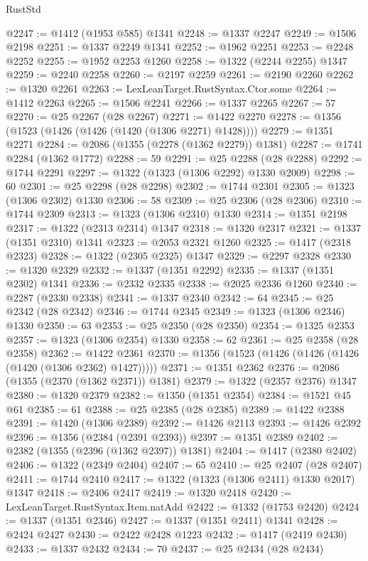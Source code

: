 \begin{lexlean}{RustStd}
\begin{coremodule}
@2247 := @1412 (@1953 @585) @1341
@2248 := @1337 @2247
@2249 := @1506 @2198
@2251 := @1337 @2249 @1341
@2252 := @1962 @2251
@2253 := @2248 @2252
@2255 := @1952 @2253 @1260
@2258 := @1322 (@2244 @2255) @1347
@2259 := @2240 @2258
@2260 := @2197 @2259
@2261 := @2190 @2260
@2262 := @1320 @2261
@2263 := LexLeanTarget.RustSyntax.Ctor.some
@2264 := @1412 @2263
@2265 := @1506 @2241
@2266 := @1337 @2265
@2267 := 57
@2270 := @25 @2267 (@28 @2267)
@2271 := @1422 @2270
@2278 := @1356 (@1523 (@1426 (@1426 (@1420 (@1306 @2271) @1428))))
@2279 := @1351 @2271
@2284 := @2086 (@1355 (@2278 (@1362 @2279)) @1381)
@2287 := @1741 @2284 (@1362 @1772)
@2288 := 59
@2291 := @25 @2288 (@28 @2288)
@2292 := @1744 @2291
@2297 := @1322 (@1323 (@1306 @2292) @1330 @2009)
@2298 := 60
@2301 := @25 @2298 (@28 @2298)
@2302 := @1744 @2301
@2305 := @1323 (@1306 @2302) @1330
@2306 := 58
@2309 := @25 @2306 (@28 @2306)
@2310 := @1744 @2309
@2313 := @1323 (@1306 @2310) @1330
@2314 := @1351 @2198
@2317 := @1322 (@2313 @2314) @1347
@2318 := @1320 @2317
@2321 := @1337 (@1351 @2310) @1341
@2323 := @2053 @2321 @1260
@2325 := @1417 (@2318 @2323)
@2328 := @1322 (@2305 @2325) @1347
@2329 := @2297 @2328
@2330 := @1320 @2329
@2332 := @1337 (@1351 @2292)
@2335 := @1337 (@1351 @2302) @1341
@2336 := @2332 @2335
@2338 := @2025 @2336 @1260
@2340 := @2287 (@2330 @2338)
@2341 := @1337 @2340
@2342 := 64
@2345 := @25 @2342 (@28 @2342)
@2346 := @1744 @2345
@2349 := @1323 (@1306 @2346) @1330
@2350 := 63
@2353 := @25 @2350 (@28 @2350)
@2354 := @1325 @2353
@2357 := @1323 (@1306 @2354) @1330
@2358 := 62
@2361 := @25 @2358 (@28 @2358)
@2362 := @1422 @2361
@2370 := @1356 (@1523 (@1426 (@1426 (@1426 (@1420 (@1306 @2362) @1427)))))
@2371 := @1351 @2362
@2376 := @2086 (@1355 (@2370 (@1362 @2371)) @1381)
@2379 := @1322 (@2357 @2376) @1347
@2380 := @1320 @2379
@2382 := @1350 (@1351 @2354)
@2384 := @1521 @45 @61
@2385 := 61
@2388 := @25 @2385 (@28 @2385)
@2389 := @1422 @2388
@2391 := @1420 (@1306 @2389)
@2392 := @1426 @2113
@2393 := @1426 @2392
@2396 := @1356 (@2384 (@2391 @2393))
@2397 := @1351 @2389
@2402 := @2382 (@1355 (@2396 (@1362 @2397)) @1381)
@2404 := @1417 (@2380 @2402)
@2406 := @1322 (@2349 @2404)
@2407 := 65
@2410 := @25 @2407 (@28 @2407)
@2411 := @1744 @2410
@2417 := @1322 (@1323 (@1306 @2411) @1330 @2017) @1347
@2418 := @2406 @2417
@2419 := @1320 @2418
@2420 := LexLeanTarget.RustSyntax.Item.natAdd
@2422 := @1332 (@1753 @2420)
@2424 := @1337 (@1351 @2346)
@2427 := @1337 (@1351 @2411) @1341
@2428 := @2424 @2427
@2430 := @2422 @2428 @1223
@2432 := @1417 (@2419 @2430)
@2433 := @1337 @2432
@2434 := 70
@2437 := @25 @2434 (@28 @2434)

\end{coremodule}
\end{lexlean}
